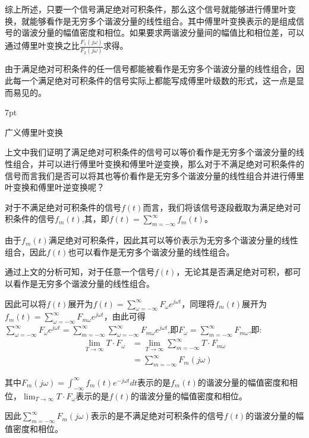 \documentclass{article}
\numberwithin{equation}{section}
\numberwithin{figure}{section}
\newenvironment{formal}{%
\def\FrameCommand{%
\hspace{1pt}%
{\color{DarkBlue}\vrule width 2pt}%
{\color{formalshade}\vrule width 4pt}%
\colorbox{formalshade}%
}%
\MakeFramed{\advance\hsize-\width\FrameRestore}%
\noindent\hspace{-4.55pt}%
\begin{adjustwidth}{}{7pt}%
\vspace{2pt}\vspace{2pt}%
}
{%
\vspace{2pt}\end{adjustwidth}\endMakeFramed%
}
\begin{document}
综上所述，只要一个信号满足绝对可积条件，那么这个信号就能够进行傅里叶变换，就能够看作是无穷多个谐波分量的线性组合。其中傅里叶变换表示的是组成信号的谐波分量的幅值密度和相位。如果要求两谐波分量间的幅值比和相位差，可以通过傅里叶变换之比$\frac{F_1{(j\omega)}}{F_2{(j\omega)}}$求得。

由于满足绝对可积条件的任一信号都能被看作是无穷多个谐波分量的线性组合，因此每一个满足绝对可积条件的信号实际上都能写成傅里叶级数的形式，这一点是显而易见的。

\begin{formal}
    广义傅里叶变换
\end{formal}

上文中我们证明了满足绝对可积条件的信号可以等价看作是无穷多个谐波分量的线性组合，并可以进行傅里叶变换和傅里叶逆变换，那么对于不满足绝对可积条件的信号而言我们是否可以将其也等价看作是无穷多个谐波分量的线性组合并进行傅里叶变换和傅里叶逆变换呢？

对于不满足绝对可积条件的信号$f(t)$而言，我们将该信号逐段截取为满足绝对可积条件的信号$f_m(t)$,其，即$f(t)=\sum_{m=-\infty}^{\infty}f_m(t)$。

由于$f_m(t)$满足绝对可积条件，因此其可以等价表示为无穷多个谐波分量的线性组合，因此$f(t)$也可以看作是无穷多个谐波分量的线性组合。

通过上文的分析可知，对于任意一个信号$f(t)$，无论其是否满足绝对可积，都可以看作是无穷多个谐波分量的线性组合。

因此可以将$f(t)$展开为$f(t)=\sum_{\omega=-\infty}^{\infty}F_\omega e^{j\omega t}$，同理将$f_m(t)$展开为$f_m(t)=\sum_{\omega=-\infty}^{\infty}F_{m\omega}e^{j\omega t}$，由此可得$\sum_{\omega=-\infty}^{\infty}F_\omega e^{j\omega t}=\sum_{m=-\infty}^{\infty}\sum_{\omega=-\infty}^{\infty}F_{m\omega}e^{j\omega t}$,即$F_\omega=\sum_{m=-\infty}^{\infty}F_{m\omega}$,即:
\begin{equation}
    \begin{split}
        \lim_{T\rightarrow \infty}T·F_\omega&=\lim_{T\rightarrow \infty}\sum_{m=-\infty}^{\infty}T·F_{m\omega}\\
        &=\sum_{m=-\infty}^{\infty}F_m(j\omega)
    \end{split}
\end{equation}

其中$F_m(j\omega)=\int_{-\infty}^{\infty}f_m(t)e^{-j\omega t}dt$表示的是$f_m(t)$的谐波分量的幅值密度和相位，$\lim_{T\rightarrow \infty}T·F_\omega$表示的是$f(t)$的谐波分量的幅值密度和相位。

因此$\sum_{m=-\infty}^{\infty}F_m(j\omega)$表示的是不满足绝对可积条件的信号$f(t)$的谐波分量的幅值密度和相位。
\end{document}
